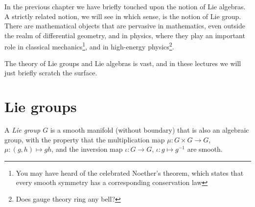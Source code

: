 In the previous chapter we have briefly touched upon the notion of Lie algebras.
A strictly related notion, we will see in which sense, is the notion of Lie group.
There are mathematical objects that are pervasive in mathematics, even outside the realm of differential geometry, and in physics, where they play an important role in classical mechanics\footnote{You may have heard of the celebrated Noether's theorem, which states that every smooth symmetry has a corresponding conservation law}, and in high-energy physics\footnote{Does gauge theory ring any bell?}.

The theory of Lie groups and Lie algebras is vast, and in these lectures we will just briefly scratch the surface.

\section{Lie groups}

\begin{definition}
	A \emph{Lie group $G$} is a smooth manifold (without boundary) that is also an algebraic group, with the property that the multiplication map $\mu: G\times G \to G$, $\mu:(g,h)\mapsto gh$, and the inversion map $\iota:G\to G$, $\iota: g\mapsto g^{-1}$ are smooth.
\end{definition}

